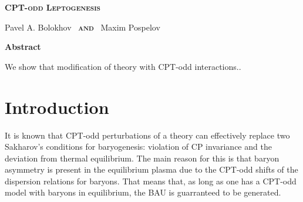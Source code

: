 \documentclass[12pt]{revtex4}
\begin{document}
\begin{titlepage}
\renewcommand{\thefootnote}{\fnsymbol{footnote}}

\vspace*{3.0cm}
\begin{center}
{\Large
  \textbf{
  \textsc{CPT-odd Leptogenesis}
         }
      }

\vspace*{1.0cm}
  {\large {}\selectfont Pavel A. Bolokhov~ 
        {\normalsize\bf \textsc{and}} ~Maxim Pospelov}

\vspace*{1.5cm}
{\large\bf Abstract}
\end{center}

        We show that modification of theory with CPT-odd interactions..

\end{titlepage}

%
%
\section{Introduction}

%
%
%
%
%
%


	It is known that CPT-odd perturbations of a theory can effectively
	replace two Sakharov's conditions for baryogenesis: violation of CP
	invariance and the deviation from thermal equilibrium.
	The main reason for this is that baryon asymmetry is present in the
	equilibrium plasma due to the CPT-odd shifts of the dispersion relations
	for baryons.
	That means that, as long as one has a CPT-odd model with baryons in equilibrium,
	the BAU is guarranteed to be generated.
	
\end{document}
